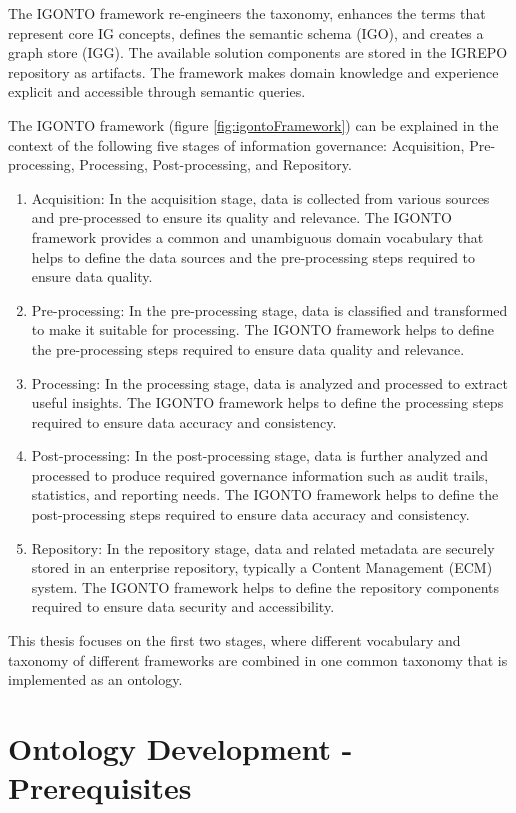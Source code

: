 \documentclass[
  a4paper,  %
  twoside,  %
  bibliography=totoc,
  headsepline,
  cleardoublepage=empty,
  parskip=half,
  draft=false
]{scrbook}
\begin{document}
The IGONTO framework re-engineers the taxonomy, enhances the terms that represent core IG concepts, defines the semantic schema (IGO), and creates a graph store (IGG). The available solution components are stored in the IGREPO repository as artifacts. The framework makes domain knowledge and experience explicit and accessible through semantic queries.

The IGONTO framework (figure \ref{fig:igontoFramework}) can be explained in the context of the following five stages of information governance: Acquisition, Pre-processing, Processing, Post-processing, and Repository.

\begin{enumerate}
    \item  Acquisition: In the acquisition stage, data is collected from various sources and pre-processed to ensure its quality and relevance. The IGONTO framework provides a common and unambiguous domain vocabulary that helps to define the data sources and the pre-processing steps required to ensure data quality.
    \item  Pre-processing: In the pre-processing stage, data is classified and transformed to make it suitable for processing. The IGONTO framework helps to define the pre-processing steps required to ensure data quality and relevance.
    \item Processing: In the processing stage, data is analyzed and processed to extract useful insights. The IGONTO framework helps to define the processing steps required to ensure data accuracy and consistency.
    \item Post-processing: In the post-processing stage, data is further analyzed and processed to produce required governance information such as audit trails, statistics, and reporting needs. The IGONTO framework helps to define the post-processing steps required to ensure data accuracy and consistency.
    \item Repository: In the repository stage, data and related metadata are securely stored in an enterprise repository, typically a Content Management (ECM) system. The IGONTO framework helps to define the repository components required to ensure data security and accessibility.
\end{enumerate}

    This thesis focuses on the first two stages, where different vocabulary and taxonomy of different frameworks are combined in one common taxonomy that is implemented as an ontology.  


\chapter{Ontology Development - Prerequisites}\label{sec:prerequisites}
\end{document}
